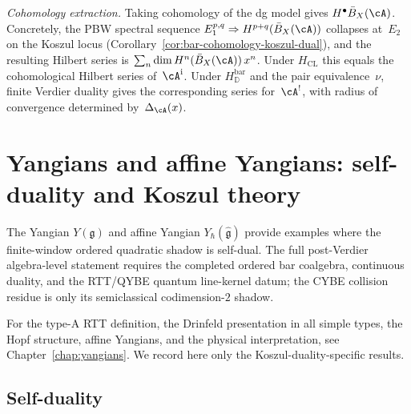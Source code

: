 \begin{remark}
\emph{Cohomology extraction.}
Taking cohomology of the dg model gives
$H^\bullet\bar B_X(\cA)$.
Concretely, the PBW spectral sequence
$E_1^{p,q} \Rightarrow H^{p+q}(\bar{B}_X(\cA))$ collapses
at~$E_2$ on the Koszul locus
(Corollary~\ref{cor:bar-cohomology-koszul-dual}),
and the resulting Hilbert series is
$\sum_n \dim H^n(\bar{B}_X(\cA))\, x^n$.  Under $H_{\mathrm{CL}}$
this equals the cohomological Hilbert series of~$\cA^{\mathrm i}$.
Under $H_{\mathbb D}^{\mathrm{bar}}$ and the pair equivalence~$\nu$,
finite Verdier duality gives the corresponding series for~$\cA^!$,
with radius of convergence determined by~$\Delta_{\cA}(x)$.
\end{remark}



\section{Yangians and affine Yangians: self-duality and Koszul theory}
\label{sec:yangians-complete}

The Yangian $Y(\mathfrak{g})$ and affine Yangian
$Y_{\hbar}(\widehat{\mathfrak{g}})$ provide examples where the
finite-window ordered quadratic shadow is self-dual. The full
post-Verdier algebra-level statement requires the completed ordered bar
coalgebra, continuous duality, and the RTT/QYBE quantum line-kernel
datum; the CYBE collision residue is only its semiclassical
codimension-$2$ shadow.

For the type-A RTT definition, the Drinfeld presentation in all simple
types, the Hopf structure, affine Yangians, and the physical
interpretation, see Chapter~\ref{chap:yangians}. We record here only
the Koszul-duality-specific results.

\subsection{Self-duality}

